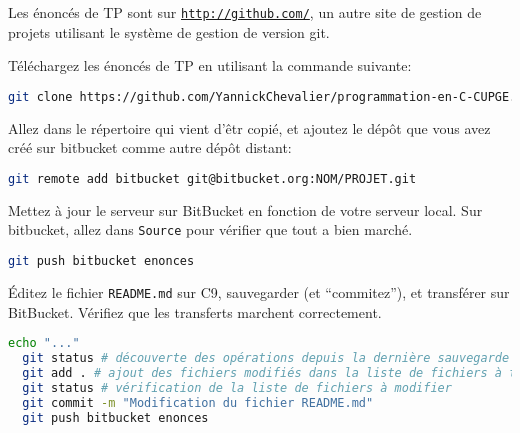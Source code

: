 
Les énoncés de TP sont sur \texttt{\url{http://github.com/}}, un autre
site de gestion de projets utilisant le système de gestion de version git.

\question Téléchargez les énoncés de TP en utilisant la commande suivante:
\begin{lstlisting}[language=bash]
  git clone https://github.com/YannickChevalier/programmation-en-C-CUPGE.git
\end{lstlisting}


\question Allez dans le répertoire qui vient d'êtr copié, et ajoutez
le dépôt que vous avez créé sur bitbucket comme autre dépôt distant:
\begin{lstlisting}[language=bash]
  git remote add bitbucket git@bitbucket.org:NOM/PROJET.git
\end{lstlisting}


\question Mettez à jour le serveur sur BitBucket en fonction de votre
serveur local.  Sur bitbucket, allez dans \texttt{Source} pour
vérifier que tout a bien marché.
\begin{lstlisting}[language=bash]
  git push bitbucket enonces
\end{lstlisting}



\question Éditez le fichier \texttt{README.md} sur C9, sauvegarder (et
``commitez''), et transférer sur BitBucket. Vérifiez que les
transferts marchent correctement.
\begin{lstlisting}[language=bash]
  echo "..."
  git status # découverte des opérations depuis la dernière sauvegarde
  git add . # ajout des fichiers modifiés dans la liste de fichiers à transférer
  git status # vérification de la liste de fichiers à modifier
  git commit -m "Modification du fichier README.md"
  git push bitbucket enonces
\end{lstlisting}
